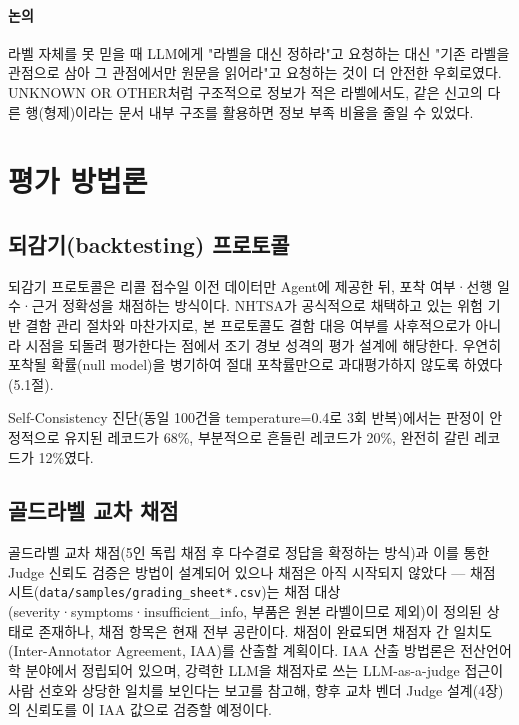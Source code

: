 \documentclass[11pt]{article}
\begin{document}
\paragraph{논의} 라벨 자체를 못 믿을 때 LLM에게 "라벨을 대신 정하라"고 요청하는 대신 "기존 라벨을 관점으로 삼아 그 관점에서만 원문을 읽어라"고 요청하는 것이 더 안전한 우회로였다. UNKNOWN OR OTHER처럼 구조적으로 정보가 적은 라벨에서도, 같은 신고의 다른 행(형제)이라는 문서 내부 구조를 활용하면 정보 부족 비율을 줄일 수 있었다.

\section{평가 방법론}

\subsection{되감기(backtesting) 프로토콜}

되감기 프로토콜은 리콜 접수일 이전 데이터만 Agent에 제공한 뒤, 포착 여부·선행 일수·근거 정확성을 채점하는 방식이다. NHTSA가 공식적으로 채택하고 있는 위험 기반 결함 관리 절차\cite{nhtsa2020riskbased}와 마찬가지로, 본 프로토콜도 결함 대응 여부를 사후적으로가 아니라 시점을 되돌려 평가한다는 점에서 조기 경보 성격의 평가 설계에 해당한다. 우연히 포착될 확률(null model)을 병기하여 절대 포착률만으로 과대평가하지 않도록 하였다(5.1절).

Self-Consistency 진단(동일 100건을 temperature=0.4로 3회 반복)에서는 판정이 안정적으로 유지된 레코드가 68\%, 부분적으로 흔들린 레코드가 20\%, 완전히 갈린 레코드가 12\%였다.

\subsection{골드라벨 교차 채점}

골드라벨 교차 채점(5인 독립 채점 후 다수결로 정답을 확정하는 방식)과 이를 통한 Judge 신뢰도 검증은 방법이 설계되어 있으나 채점은 아직 시작되지 않았다 — 채점 시트(\texttt{data/samples/grading\_sheet*.csv})는 채점 대상(severity·symptoms·insufficient\_info, 부품은 원본 라벨이므로 제외)이 정의된 상태로 존재하나, 채점 항목은 현재 전부 공란이다.
채점이 완료되면 채점자 간 일치도(Inter-Annotator Agreement, IAA)를 산출할 계획이다. IAA 산출 방법론은 전산언어학 분야에서 정립되어 있으며\cite{artstein2008intercoder}, 강력한 LLM을 채점자로 쓰는 LLM-as-a-judge 접근이 사람 선호와 상당한 일치를 보인다는 보고\cite{zheng2023judging}를 참고해, 향후 교차 벤더 Judge 설계(4장)의 신뢰도를 이 IAA 값으로 검증할 예정이다.
\end{document}
